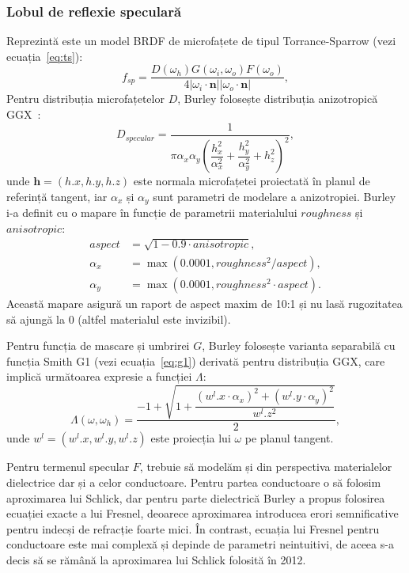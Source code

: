 \documentclass[12pt,a4paper]{report}
\numberwithin{equation}{section} %
\begin{document}
\subsubsection*{Lobul de reflexie speculară}

Reprezintă este un model BRDF de microfațete de tipul Torrance-Sparrow (vezi ecuația~\ref{eq:ts}):
\begin{equation}\label{eq:disney_specular}
	f_{sp} = \dfrac{D(\omega_h)G(\omega_i, \omega_o)F(\omega_o)}{4|\omega_i \cdot \mathbf{n} ||\omega_o \cdot \mathbf{n}|},
\end{equation}
Pentru distribuția microfațetelor $D$, Burley folosește distribuția anizotropică GGX~\cite{WalterSmithG2}:
\begin{equation}
	D_{specular} = \dfrac{1}{\pi\alpha_x\alpha_y\left(\dfrac{h_x^2}{\alpha_x^2} + \dfrac{h_y^2}{\alpha_y^2} + h_z^2\right)^2},
\end{equation}
unde $\mathbf{h} = (h.x, h.y, h.z)$ este normala microfațetei proiectată în planul de referință tangent,
iar $\alpha_x$ și $\alpha_y$ sunt parametri de modelare a anizotropiei. Burley i-a definit
cu o mapare în funcție de parametrii materialului $roughness$ și $anisotropic$:
\begin{equation}
	\begin{aligned}
		aspect   & = \sqrt{1 - 0.9\cdot anisotropic},        \\
		\alpha_x & = \max(0.0001, roughness^2 / aspect),     \\
		\alpha_y & = \max(0.0001, roughness^2 \cdot aspect).
	\end{aligned}
\end{equation}
Această mapare asigură un raport de aspect maxim de 10:1 și nu lasă rugozitatea
să ajungă la 0 (altfel materialul este invizibil).

Pentru funcția de mascare și umbrirei $G$, Burley folosește varianta separabilă cu funcția Smith G1 (vezi ecuația~\ref{eq:g1}) derivată
pentru distribuția GGX, care implică următoarea expresie a funcției $\Lambda$:
\begin{equation}\label{eq:gamma}
	\Lambda(\omega, \omega_h) = \dfrac{-1 + \sqrt{1 + \dfrac{(w^l.x\cdot \alpha_x)^2 + (w^l.y\cdot \alpha_y)^2}{w^l.z^2}}}{2},
\end{equation}
unde $w^l = (w^l.x, w^l.y, w^l.z)$ este proiecția lui $\omega$ pe planul tangent.

Pentru termenul specular $F$, trebuie să modelăm și din perspectiva materialelor
dielectrice dar și a celor conductoare. Pentru partea conductoare o să folosim
aproximarea lui Schlick, dar pentru parte dielectrică Burley a propus folosirea
ecuației exacte a lui Fresnel, deoarece aproximarea introducea erori semnificative
pentru indecși de refracție foarte mici. În contrast, ecuația lui Fresnel pentru
conductoare este mai complexă și depinde de parametri neintuitivi, de aceea
s-a decis să se rămână la aproximarea lui Schlick folosită în 2012.
\end{document}
